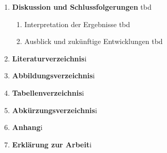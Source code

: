 {\begin{enumerate}[label=\arabic*,font=\bfseries]
        \item \textbf{Diskussion und Schlussfolgerungen} \secdotfill tbd
        \begin{enumerate}[label*=.\arabic*]
            \item Interpretation der Ergebnisse \subsecdotfill tbd
            \item Ausblick und zukünftige Entwicklungen \subsecdotfill tbd
        \end{enumerate}
        \item[] \hspace{-1cm} \textbf{Literaturverzeichnis}\enspace  \secdotfill \enspace i
        \item[] \hspace{-1cm} \textbf{Abbildungsverzeichnis}\enspace  \secdotfill \enspace i
        \item[] \hspace{-1cm} \textbf{Tabellenverzeichnis}\enspace  \secdotfill \enspace i
        \item[] \hspace{-1cm} \textbf{Abkürzungsverzeichnis}\enspace  \secdotfill \enspace i
        \item[] \hspace{-1cm} \textbf{Anhang}\enspace  \secdotfill \enspace i
        \item[] \hspace{-1cm} \textbf{Erklärung zur Arbeit}\enspace  \secdotfill \enspace i
        
    \end{enumerate}
}
